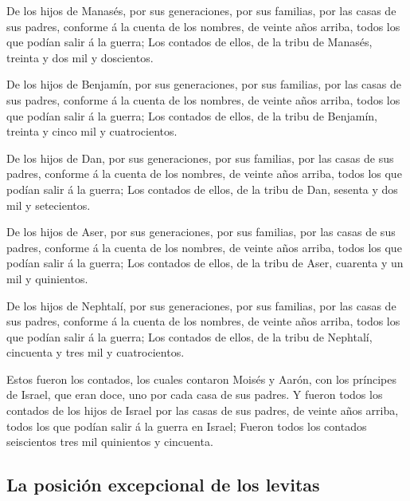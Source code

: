  De los hijos de Manasés, por sus generaciones, por sus
familias, por las casas de sus padres, conforme á la cuenta de los
nombres, de veinte años arriba, todos los que podían salir á la guerra;
 Los contados de ellos, de la tribu de Manasés, treinta y
dos mil y doscientos.

 De los hijos de Benjamín, por sus generaciones, por sus
familias, por las casas de sus padres, conforme á la cuenta de los
nombres, de veinte años arriba, todos los que podían salir á la guerra;
 Los contados de ellos, de la tribu de Benjamín, treinta
y cinco mil y cuatrocientos.

 De los hijos de Dan, por sus generaciones, por sus
familias, por las casas de sus padres, conforme á la cuenta de los
nombres, de veinte años arriba, todos los que podían salir á la guerra;
 Los contados de ellos, de la tribu de Dan, sesenta y dos
mil y setecientos.

 De los hijos de Aser, por sus generaciones, por sus
familias, por las casas de sus padres, conforme á la cuenta de los
nombres, de veinte años arriba, todos los que podían salir á la guerra;
 Los contados de ellos, de la tribu de Aser, cuarenta y
un mil y quinientos.

 De los hijos de Nephtalí, por sus generaciones, por sus
familias, por las casas de sus padres, conforme á la cuenta de los
nombres, de veinte años arriba, todos los que podían salir á la guerra;
 Los contados de ellos, de la tribu de Nephtalí,
cincuenta y tres mil y cuatrocientos.

 Estos fueron los contados, los cuales contaron Moisés y
Aarón, con los príncipes de Israel, que eran doce, uno por cada casa de
sus padres.  Y fueron todos los contados de los hijos de
Israel por las casas de sus padres, de veinte años arriba, todos los que
podían salir á la guerra en Israel;  Fueron todos los
contados seiscientos tres mil quinientos y cincuenta.

\hypertarget{la-posiciuxf3n-excepcional-de-los-levitas}{%
\subsection{La posición excepcional de los
levitas}\label{la-posiciuxf3n-excepcional-de-los-levitas}}

